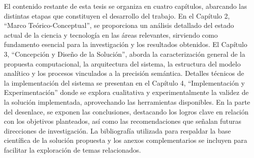 El contenido restante de esta tesis se organiza en cuatro capítulos, abarcando las distintas etapas que constituyen el desarrollo del trabajo. En el Capítulo 2, ``Marco Teórico-Conceptual'', se proporciona un análisis detallado del estado actual de la ciencia y tecnología en las áreas relevantes, sirviendo como fundamento esencial para la investigación y los resultados obtenidos. El Capítulo 3, ``Concepción y Diseño de la Solución'', aborda la caracterización general de la propuesta computacional, la arquitectura del sistema, la estructura del modelo analítico y los procesos vinculados a la precisi\'on sem\'antica. Detalles técnicos de la implementación del sistema se presentan en el Capítulo 4, ``Implementación y Experimentación'' donde se explora cualitativa y experimentalmente la validez de la solución implementada, aprovechando las herramientas disponibles. En la parte del desenlace, se exponen las conclusiones, destacando los logros clave en relación con los objetivos planteados, así como las recomendaciones que señalan futuras direcciones de investigación. La bibliografía utilizada para respaldar la base científica de la solución propuesta y los anexos complementarios se incluyen para facilitar la exploración de temas relacionados.
